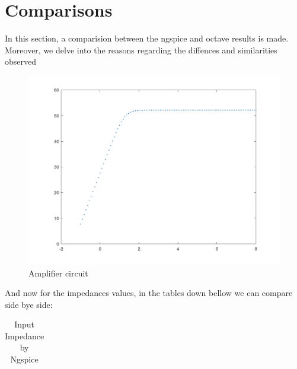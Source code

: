 \section{Comparisons}
\label{sec:comparsisons}

In this section, a comparision between the ngspice and octave results is made. Moreover, we delve into the reasons regarding the diffences and similarities observed\\


\begin{figure} [!htb] 
  \includegraphics[width=\linewidth]{GAINVERDADEIRO.png}
  \caption{Amplifier circuit}
  \label{fig:theoplots}
  \endminipage\hfill
\end{figure}





And now for the impedances values, in the tables down bellow we can compare side bye side:
\FloatBarrier
\begin{table}[h]
  \centering
  \begin{tabular}{|c|c|}
    \hline    
    
    \hline
  \end{tabular}
  \caption{Input Impedance by Ngspice}
  \label{tab:Spice1}
\end{table}
\FloatBarrier   

